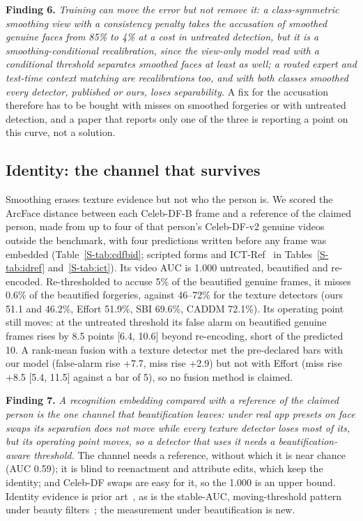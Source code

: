 \documentclass[conference]{IEEEtran}
\begin{document}
\textbf{Finding 6.} \emph{Training can move the error but not remove it: a class-symmetric smoothing view with a
consistency penalty takes the accusation of smoothed genuine faces from 85\% to 4\% at a cost in untreated detection, but it is
a smoothing-conditional recalibration, since the view-only model read with a conditional threshold separates smoothed
faces at least as well; a routed expert and test-time context matching are recalibrations too, and with both classes
smoothed every detector, published or ours, loses separability.}
A fix for the accusation therefore has to be bought with misses on smoothed forgeries or with untreated detection, and a
paper that reports only one of the three is reporting a point on this curve, not a solution.

\subsection{Identity: the channel that survives}
\label{sec:identity}
Smoothing erases texture evidence but not who the person is. We scored the ArcFace distance between each Celeb-DF-B frame and
a reference of the claimed person, made from up to four of that person's Celeb-DF-v2 genuine videos outside the benchmark, with
four predictions written before any frame was embedded (Table~\ref{S-tab:cdfbid}; scripted forms and ICT-Ref~\cite{ict2022} in
Tables~\ref{S-tab:idref} and~\ref{S-tab:ict}). Its video AUC is 1.000 untreated, beautified and re-encoded. Re-thresholded to
accuse 5\% of the beautified genuine frames, it misses 0.6\% of the beautified forgeries, against 46--72\% for the texture
detectors (ours 51.1 and 46.2\%, Effort 51.9\%, SBI 69.6\%, CADDM 72.1\%). Its operating point still moves: at the untreated
threshold its false alarm on beautified genuine frames rises by 8.5 points [6.4, 10.6] beyond re-encoding, short of the
predicted 10. A rank-mean fusion with a texture detector met the pre-declared bars with our model (false-alarm rise +7.7, miss
rise +2.9) but not with Effort (miss rise +8.5 [5.4, 11.5] against a bar of 5), so no fusion method is claimed.

\textbf{Finding 7.} \emph{A recognition embedding compared with a reference of the claimed person is the one channel that
beautification leaves: under real app presets on face swaps its separation does not move while every texture detector loses
most of its, but its operating point moves, so a detector that uses it needs a beautification-aware threshold.} The channel
needs a reference, without which it is near chance (AUC 0.59); it is blind to reenactment and attribute edits, which keep the
identity; and Celeb-DF swaps are easy for it, so the 1.000 is an upper bound. Identity evidence is prior
art~\cite{idreveal2021,ict2022,yin2026}, as is the stable-AUC, moving-threshold pattern under beauty filters~\cite{mirabet2025};
the measurement under beautification is new.
\end{document}
